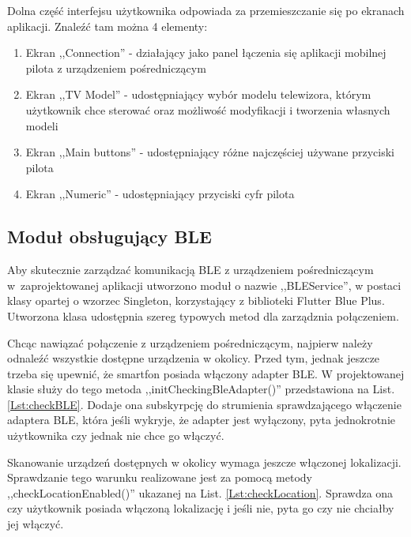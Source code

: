 \documentclass[12pt,twoside]{article}
\begin{document}
Dolna część interfejsu użytkownika odpowiada za przemieszczanie się po ekranach aplikacji. Znaleźć tam można 4 elementy:
\begin{enumerate}[label=\alph*), leftmargin=1.25cm]
   \item Ekran ,,Connection'' - działający jako panel łączenia się aplikacji mobilnej pilota z urządzeniem pośredniczącym
   \item Ekran ,,TV Model'' - udostępniający wybór modelu telewizora, którym użytkownik chce sterować oraz możliwość modyfikacji i tworzenia własnych modeli
   \item Ekran ,,Main buttons'' - udostępniający różne najczęściej używane przyciski pilota
   \item Ekran ,,Numeric'' - udostępniający przyciski cyfr pilota
\end{enumerate}

\subsection{Moduł obsługujący BLE}
Aby skutecznie zarządzać komunikacją BLE z urządzeniem pośredniczącym w~zaprojektowanej aplikacji utworzono moduł o nazwie ,,BLEService'', w postaci klasy opartej o wzorzec Singleton, korzystający z biblioteki Flutter Blue Plus\cite{flutterBluePlus}. Utworzona klasa udostępnia szereg typowych metod dla zarządznia połączeniem.

Chcąc nawiązać połączenie z urządzeniem pośredniczącym, najpierw należy odnaleźć wszystkie dostępne urządzenia w okolicy. Przed tym, jednak jeszcze trzeba się upewnić, że smartfon posiada włączony adapter BLE. W projektowanej klasie służy do tego metoda ,,initCheckingBleAdapter()'' przedstawiona na List. \ref*{Lst:checkBLE}. Dodaje ona subskyrpcję do strumienia sprawdzającego włączenie adaptera BLE, która jeśli wykryje, że adapter jest wyłączony, pyta jednokrotnie użytkownika czy jednak nie chce go włączyć.



Skanowanie urządzeń dostępnych w okolicy wymaga jeszcze włączonej lokalizacji. Sprawdzanie tego warunku realizowane jest za pomocą metody ,,checkLocationEnabled()'' ukazanej na List. \ref*{Lst:checkLocation}. Sprawdza ona czy użytkownik posiada włączoną lokalizację i jeśli nie, pyta go czy nie chciałby jej włączyć.


\end{document}
